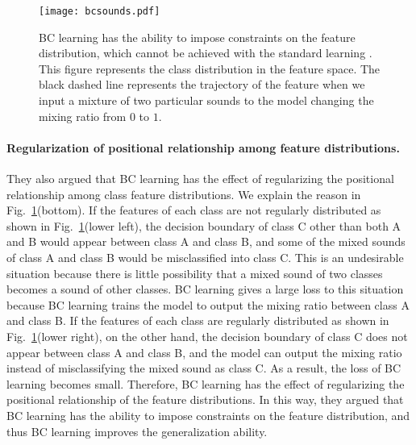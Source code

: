 \documentclass[10pt,twocolumn,letterpaper]{article}
\begin{document}
\begin{figure}
	\centering
	\texttt{[image: bcsounds.pdf]}
	\vspace{2mm}
	\caption{BC learning has the ability to impose constraints on the feature distribution, which cannot be achieved with the standard learning \cite{tokozume2018learning}. This figure represents the class distribution in the feature space. The black dashed line represents the trajectory of the feature when we input a mixture of two particular sounds to the model changing the mixing ratio from $0$ to $1$.}
	\label{fig:bcsounds}
	\vspace{-2mm}
\end{figure}

\paragraph{Regularization of positional relationship among feature distributions.}
They also argued that BC learning has the effect of regularizing the positional relationship among class feature distributions. We explain the reason in Fig.~\ref{fig:bcsounds}(bottom). If the features of each class are not regularly distributed as shown in Fig.~\ref{fig:bcsounds}(lower left), the decision boundary of class C other than both A and B would appear between class A and class B, and some of the mixed sounds of class A and class B would be misclassified into class C. This is an undesirable situation because there is little possibility that a mixed sound of two classes becomes a sound of other classes. BC learning gives a large loss to this situation because BC learning trains the model to output the mixing ratio between class A and class B. If the features of each class are regularly distributed as shown in Fig.~\ref{fig:bcsounds}(lower right), on the other hand, the decision boundary of class C does not appear between class A and class B, and the model can output the mixing ratio instead of misclassifying the mixed sound as class C. As a result, the loss of BC learning becomes small. Therefore, BC learning has the effect of regularizing the positional relationship of the feature distributions. In this way, they argued that BC learning has the ability to impose constraints on the feature distribution, and thus BC learning improves the generalization ability.
\end{document}
